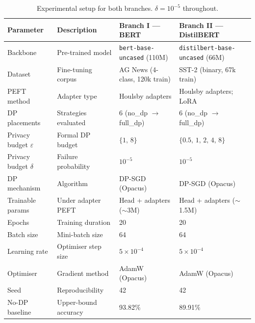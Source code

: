 \documentclass[10pt,letterpaper]{article}
\begin{document}
\begin{table}[h]
\centering
\caption{Experimental setup for both branches. $\delta = 10^{-5}$ throughout.}
\label{tab:setup}
\small
\setlength{\tabcolsep}{6pt}
\begin{tabular}{l l l l}
\hline
\textbf{Parameter} & \textbf{Description}
  & \textbf{Branch I — BERT} & \textbf{Branch II — DistilBERT} \\
\hline
Backbone          & Pre-trained model
  & \texttt{bert-base-uncased} (110M) & \texttt{distilbert-base-uncased} (66M) \\
Dataset           & Fine-tuning corpus
  & AG News (4-class, 120k train) & SST-2 (binary, 67k train) \\
PEFT method       & Adapter type
  & Houlsby adapters & Houlsby adapters; LoRA \\
DP placements     & Strategies evaluated
  & 6 (no\_dp $\to$ full\_dp) & 6 (no\_dp $\to$ full\_dp) \\
Privacy budget $\varepsilon$ & Formal DP budget
  & $\{1,\,8\}$ & $\{0.5,\,1,\,2,\,4,\,8\}$ \\
Privacy budget $\delta$ & Failure probability
  & $10^{-5}$ & $10^{-5}$ \\
DP mechanism      & Algorithm
  & DP-SGD (Opacus) & DP-SGD (Opacus) \\
Trainable params  & Under adapter PEFT
  & Head + adapters ($\sim$3M) & Head + adapters ($\sim$1.5M) \\
Epochs            & Training duration        & 20 & 20 \\
Batch size        & Mini-batch size          & 64 & 64 \\
Learning rate     & Optimiser step size      & $5\times10^{-4}$ & $5\times10^{-4}$ \\
Optimiser         & Gradient method          & AdamW (Opacus) & AdamW (Opacus) \\
Seed              & Reproducibility          & 42 & 42 \\
No-DP baseline    & Upper-bound accuracy     & 93.82\% & 89.91\% \\
\hline
\end{tabular}
\end{table}

\bigskip
\end{document}
